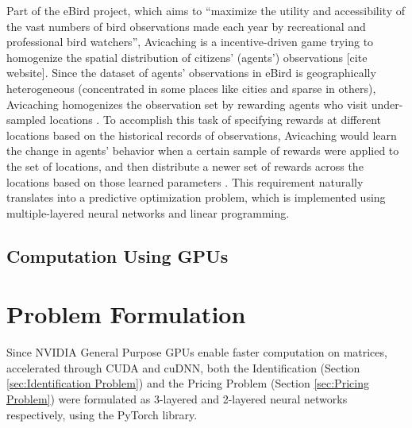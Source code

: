 \documentclass[12pt]{article}
\begin{document}
    Part of the eBird project, which aims to ``maximize the utility and accessibility of the vast numbers of bird observations made each year by recreational and professional bird watchers'', Avicaching is a incentive-driven game trying to homogenize the spatial distribution of citizens' (agents') observations [cite website]. Since the dataset of agents' observations in eBird is geographically heterogeneous (concentrated in some places like cities and sparse in others), Avicaching homogenizes the observation set by rewarding agents who visit under-sampled locations \cite{Xue2016Avi1}. To accomplish this task of specifying rewards at different locations based on the historical records of observations, Avicaching would learn the change in agents' behavior when a certain sample of rewards were applied to the set of locations, and then distribute a newer set of rewards across the locations based on those learned parameters \cite{Xue2016Avi2}. This requirement naturally translates into a predictive optimization problem, which is implemented using multiple-layered neural networks and linear programming.

    \subsection{Computation Using GPUs} \label{sec:comp_using_GPUs}
    \blindtext
    
    \section{Problem Formulation} \label{sec:Problem Formulation}
    Since NVIDIA General Purpose GPUs enable faster computation on matrices, accelerated through CUDA and cuDNN, both the Identification (Section \ref{sec:Identification Problem}) and the Pricing Problem (Section \ref{sec:Pricing Problem}) were formulated as 3-layered and 2-layered neural networks respectively, using the PyTorch library.
    
\end{document}
